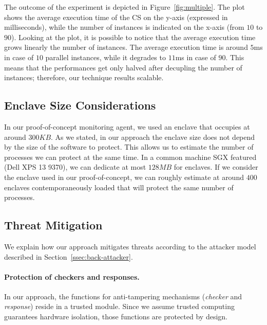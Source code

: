 The outcome of the experiment is depicted in Figure~\ref{fig:multiple}.
The plot shows the average execution time of the CS on the y-axis (expressed in 
milliseconds), while 
the number of instances is indicated on the x-axis (from $10$ to $90$).
Looking at the plot, it is possible to notice that the average execution time 
grows linearly \wrt the number of instances.
The average execution time is around $5$ms in case of $10$ parallel instances, 
while it degrades to $11$ms in case of $90$. 
This means that the performances get only halved after decupling the number of 
instances; therefore, our technique results scalable.

\subsection{Enclave Size Considerations}
In our proof-of-concept monitoring agent, we used an enclave that occupies at 
around $300KB$.
As we stated, in our approach the enclave size does not depend by the size of 
the software to protect.
This allows us to estimate the number of processes we can protect at the same 
time.
In a common machine SGX featured (\eg Dell XPS 13 9370), we can dedicate at 
most $128MB$ for enclaves.
If we consider the enclave used in our proof-of-concept, we can roughly 
estimate at around $400$ enclaves contemporaneously loaded that will protect 
the same number of processes.

\subsection{Threat Mitigation}
We explain how our approach mitigates threats according to the attacker model 
described in Section~\ref{ssec:back-attacker}.

\paragraph{Protection of checkers and responses.} In our approach, the 
functions for anti-tampering mechanisms (\eg \emph{checker} and 
\emph{response}) reside in a trusted module. Since we assume trusted computing 
guarantees hardware isolation, those functions are protected by design.

